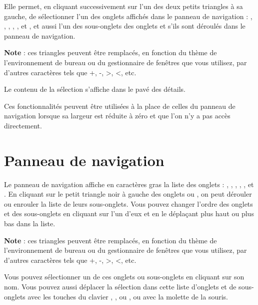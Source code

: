 Elle permet, en cliquant successivement sur l'un des deux petits triangles à sa gauche, de sélectionner l'un des onglets affichés dans le panneau de navigation  : , , , , ,  et , et aussi l'un des sous-onglets des onglets  et  s'ils sont déroulés dans le panneau de navigation.

\textbf{Note} : ces triangles peuvent être remplacés, en fonction du thème de l'environnement de bureau ou du gestionnaire de fenêtres que vous utilisez, par d'autres caractères tels que +, -, >, <, etc.

Le contenu de la sélection s'affiche dans le pavé des détails.

Ces fonctionnalités peuvent être utilisées à la place de celles du panneau de navigation lorsque sa largeur est réduite à zéro et que l'on n'y a pas accès directement.


\section{Panneau de navigation\label{home-accounting}}


Le panneau de navigation affiche en caractères gras la liste des onglets : , , , , ,  et . En cliquant sur le petit triangle noir à gauche des onglets  ou , on peut dérouler ou enrouler la liste de leurs sous-onglets. Vous pouvez changer l'ordre des onglets et des sous-onglets en cliquant sur l'un d'eux et en le déplaçant plus haut ou plus bas dans la liste.

\textbf{Note} : ces triangles peuvent être remplacés, en fonction du thème de l'environnement de bureau ou du gestionnaire de fenêtres que vous utilisez, par d'autres caractères tels que +, -, >, <, etc.

Vous pouvez sélectionner un de ces onglets ou sous-onglets en cliquant sur son nom. Vous pouvez aussi déplacer la sélection dans cette liste d'onglets et de sous-onglets avec les touches du clavier , ,  ou , ou avec la molette de la souris. 

